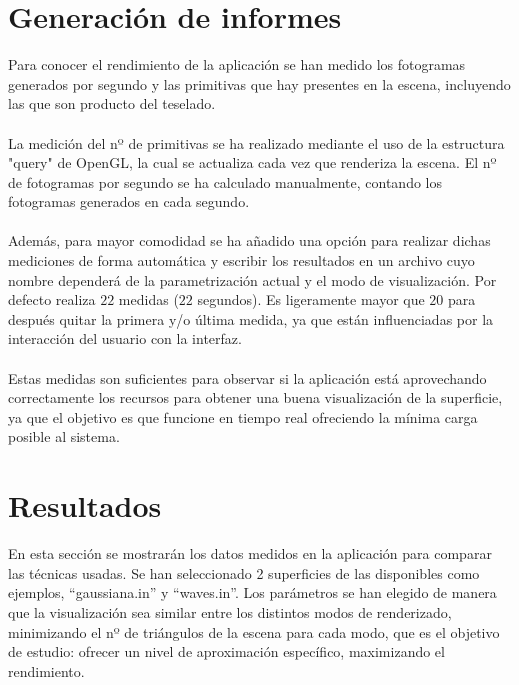 \section*{Generación de informes}
Para conocer el rendimiento de la aplicación se han medido los fotogramas generados por segundo y las primitivas que hay presentes en la escena, incluyendo las que son producto del teselado.\\
\\La medición del nº de primitivas se ha realizado mediante el uso de la estructura "query" de OpenGL, la cual se actualiza cada vez que renderiza la escena. El nº de fotogramas por segundo se ha calculado manualmente, contando los fotogramas generados en cada segundo.\\
\\Además, para mayor comodidad se ha añadido una opción para realizar dichas mediciones de forma automática y escribir los resultados en un archivo cuyo nombre dependerá de la parametrización actual y el modo de visualización. Por defecto realiza $22$ medidas ($22$ segundos). Es ligeramente mayor que $20$ para después quitar la primera y/o última medida, ya que están influenciadas por la interacción del usuario con la interfaz.\\
\\Estas medidas son suficientes para observar si la aplicación está aprovechando correctamente los recursos para obtener una buena visualización de la superficie, ya que el objetivo es que funcione en tiempo real ofreciendo la mínima carga posible al sistema.

\section*{Resultados}
	En esta sección se mostrarán los datos medidos en la aplicación para comparar las técnicas usadas. Se han seleccionado 2 superficies de las disponibles como ejemplos, ``gaussiana.in'' y ``waves.in''. Los parámetros se han elegido de manera que la visualización sea similar entre los distintos modos de renderizado, minimizando el nº de triángulos de la escena para cada modo, que es el objetivo de estudio: ofrecer un nivel de aproximación específico, maximizando el rendimiento.
		
